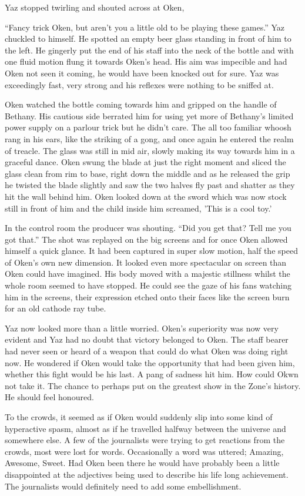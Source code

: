 Yaz stopped twirling and shouted across at Oken,

``Fancy trick Oken, but aren't you a little old to be playing these games.'' Yaz chuckled to himself. He spotted an empty beer glass standing in front of him to the left. He gingerly put the end of his staff into the neck of the bottle and with one fluid motion flung it towards Oken's head. His aim was impecible and had Oken not seen it coming, he would have been knocked out for sure. Yaz was exceedingly fast, very strong and his reflexes were nothing to be sniffed at.

Oken watched the bottle coming towards him and gripped on the handle of Bethany. His cautious side berrated him for using yet more of Bethany's limited power supply on a parlour trick but he didn't care. The all too familiar whoosh rang in his ears, like the striking of a gong, and once again he entered the realm of treacle. The glass was still in mid air, slowly making its way towards him in a graceful dance. Oken swung the blade at just the right moment and sliced the glass clean from rim to base, right down the middle and as he released the grip he twisted the blade slightly and saw the two halves fly past and shatter as they hit the wall behind him. Oken looked down at the sword which was now stock still in front of him and the child inside him screamed, 'This is a cool toy.'

In the control room the producer was shouting. ``Did you get that? Tell me you got that.'' The shot was replayed on the big screens and for once Oken allowed himself a quick glance. It had been captured in super slow motion, half the speed of Oken's own new dimension. It looked even more spectacular on screen than Oken could have imagined. His body moved with a majestic stillness whilst the whole room seemed to have stopped. He could see the gaze of his fans watching him in the screens, their expression etched onto their faces like the screen burn for an old cathode ray tube.

Yaz now looked more than a little worried. Oken's superiority was now very evident and Yaz had no doubt that victory belonged to Oken. The staff bearer had never seen or heard of a weapon that could do what Oken was doing right now. He wondered if Oken would take the opportunity that had been given him, whether this fight would be his last. A pang of sadness hit him. How could Okwn not take it. The chance to perhaps put on the greatest show in the Zone's history. He should feel honoured.

To the crowds, it seemed as if Oken would suddenly slip into some kind of hyperactive spasm, almost as if he travelled halfway between the universe and somewhere else. A few of the journalists were trying to get reactions from the crowds, most were lost for words. Occasionally a word was uttered; Amazing, Awesome, Sweet. Had Oken been there he would have probably been a little disappointed at the adjectives being used to describe his life long achievement. The journalists would definitely need to add some embellishment.

